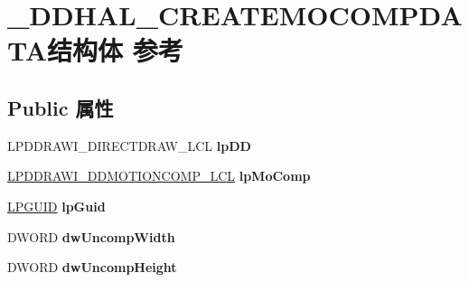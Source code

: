 \hypertarget{struct___d_d_h_a_l___c_r_e_a_t_e_m_o_c_o_m_p_d_a_t_a}{}\section{\+\_\+\+D\+D\+H\+A\+L\+\_\+\+C\+R\+E\+A\+T\+E\+M\+O\+C\+O\+M\+P\+D\+A\+T\+A结构体 参考}
\label{struct___d_d_h_a_l___c_r_e_a_t_e_m_o_c_o_m_p_d_a_t_a}
\subsection*{Public 属性}
\begin{DoxyCompactItemize}
\item 
\mbox{\label{struct___d_d_h_a_l___c_r_e_a_t_e_m_o_c_o_m_p_d_a_t_a_a8fe07b1669902c2cad65b5fcc2770630}} 
L\+P\+D\+D\+R\+A\+W\+I\+\_\+\+D\+I\+R\+E\+C\+T\+D\+R\+A\+W\+\_\+\+L\+CL {\bfseries lp\+DD}
\item 
\mbox{\label{struct___d_d_h_a_l___c_r_e_a_t_e_m_o_c_o_m_p_d_a_t_a_a227cd5dc9ecbaa46556f31b7d0f72145}} 
\hyperlink{struct___d_d_r_a_w_i___d_d_m_o_t_i_o_n_c_o_m_p___l_c_l}{L\+P\+D\+D\+R\+A\+W\+I\+\_\+\+D\+D\+M\+O\+T\+I\+O\+N\+C\+O\+M\+P\+\_\+\+L\+CL} {\bfseries lp\+Mo\+Comp}
\item 
\mbox{\label{struct___d_d_h_a_l___c_r_e_a_t_e_m_o_c_o_m_p_d_a_t_a_a5a2a80acf52c4ce56883c7d5bb2acf8b}} 
\hyperlink{interface_g_u_i_d}{L\+P\+G\+U\+ID} {\bfseries lp\+Guid}
\item 
\mbox{\label{struct___d_d_h_a_l___c_r_e_a_t_e_m_o_c_o_m_p_d_a_t_a_a76efa29ebe1a98950fb90473207716b3}} 
D\+W\+O\+RD {\bfseries dw\+Uncomp\+Width}
\item 
\mbox{\label{struct___d_d_h_a_l___c_r_e_a_t_e_m_o_c_o_m_p_d_a_t_a_a6c6aecb5e20d5793dc6ac28e2f1e59b3}} 
D\+W\+O\+RD {\bfseries dw\+Uncomp\+Height}
\item 
\mbox{\label{struct___d_d_h_a_l___c_r_e_a_t_e_m_o_c_o_m_p_d_a_t_a_acbd3cce1e9f7947f66c2ad34c7f941c4}} 

\end{DoxyCompactItemize}
